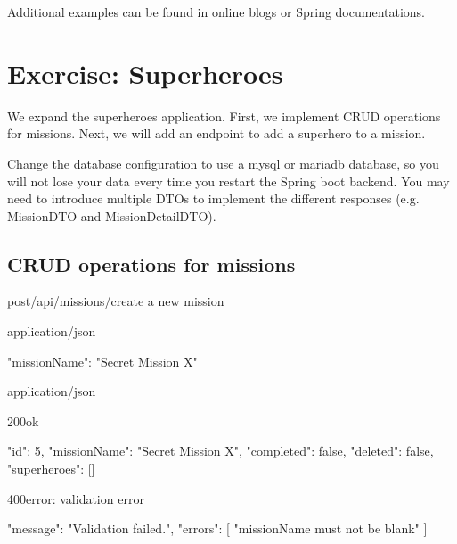 	
Additional examples can be found in online blogs \cite{mockmvc} or Spring documentations. 	

\section{Exercise: Superheroes}

We expand the superheroes application.  First, we implement CRUD operations for missions.  Next, we will add an endpoint to add a superhero to a mission. 

Change the database configuration to use a mysql or mariadb database, so you will not lose your data every time you restart the Spring boot backend.
You may need to introduce multiple DTOs to implement the different responses (e.g. MissionDTO and MissionDetailDTO).

\subsection{CRUD operations for missions}

\begin{apiRoute}{post}{/api/missions/}{create a new mission}
	\begin{routeParameter}
	\end{routeParameter}
	\begin{routeRequest}{application/json}
		\begin{routeRequestBody}
{
	"missionName": "Secret Mission X"
}
		\end{routeRequestBody}
	\end{routeRequest}
	\begin{routeResponse}{application/json}
		\begin{routeResponseItem}{200}{ok}
			\begin{routeResponseItemBody}
{
	"id": 5,
	"missionName": "Secret Mission X",
	"completed": false,
	"deleted": false,
	"superheroes": []
}
			\end{routeResponseItemBody}
		\end{routeResponseItem}
	\begin{routeResponseItem}{400}{error: validation error}
	\begin{routeResponseItemBody}
	{
	"message": "Validation failed.",
	"errors": [
		"missionName must not be blank"
	]
   }
   \end{routeResponseItemBody}
	\end{routeResponseItem}
	
	\end{routeResponse}
\end{apiRoute}

